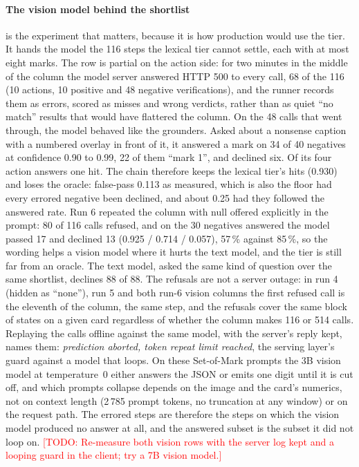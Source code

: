 \documentclass[conference]{IEEEtran}
\newcommand{\todo}[1]{\textcolor{red}{[TODO: #1]}}
\begin{document}
\paragraph{The vision model behind the shortlist} is the experiment that matters, because it is how production would use the tier. It hands the model the 116 steps the lexical tier cannot settle, each with at most eight marks. The row is partial on the action side: for two minutes in the middle of the column the model server answered HTTP 500 to every call, 68 of the 116 (10 actions, 10 positive and 48 negative verifications), and the runner records them as errors, scored as misses and wrong verdicts, rather than as quiet ``no match'' results that would have flattered the column. On the 48 calls that went through, the model behaved like the grounders. Asked about a nonsense caption with a numbered overlay in front of it, it answered a mark on 34 of 40 negatives at confidence 0.90 to 0.99, 22 of them ``mark 1'', and declined six. Of its four action answers one hit. The chain therefore keeps the lexical tier's hits (0.930) and loses the oracle: false-pass 0.113 as measured, which is also the floor had every errored negative been declined, and about 0.25 had they followed the answered rate. Run 6 repeated the column with null offered explicitly in the prompt: 80 of 116 calls refused, and on the 30 negatives answered the model passed 17 and declined 13 (0.925 / 0.714 / 0.057), 57\,\% against 85\,\%, so the wording helps a vision model where it hurts the text model, and the tier is still far from an oracle. The text model, asked the same kind of question over the same shortlist, declines 88 of 88. The refusals are not a server outage: in run 4 (hidden as ``none''), run 5 and both run-6 vision columns the first refused call is the eleventh of the column, the same step, and the refusals cover the same block of states on a given card regardless of whether the column makes 116 or 514 calls. Replaying the calls offline against the same model, with the server's reply kept, names them: \emph{prediction aborted, token repeat limit reached}, the serving layer's guard against a model that loops. On these Set-of-Mark prompts the 3B vision model at temperature~0 either answers the JSON or emits one digit until it is cut off, and which prompts collapse depends on the image and the card's numerics, not on context length (2\,785 prompt tokens, no truncation at any window) or on the request path. The errored steps are therefore the steps on which the vision model produced no answer at all, and the answered subset is the subset it did not loop on. \todo{Re-measure both vision rows with the server log kept and a looping guard in the client; try a 7B vision model.}
\end{document}
